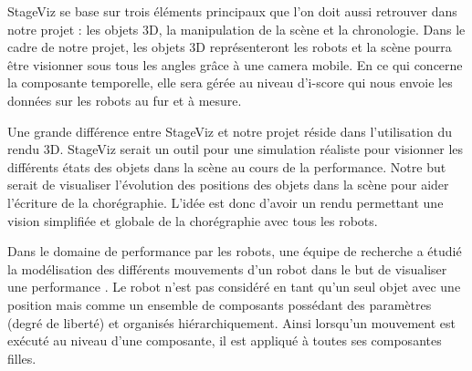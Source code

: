 StageViz se base sur trois éléments principaux que l'on doit aussi retrouver dans notre projet : les objets 3D, la manipulation de la scène et la chronologie. Dans le cadre de notre projet, les objets 3D représenteront les robots et la scène pourra être visionner sous tous les angles grâce à une camera mobile. En ce qui concerne la composante temporelle, elle sera gérée au niveau d'i-score qui nous envoie les données sur les robots au fur et à mesure. 

Une grande différence entre StageViz et notre projet réside dans l'utilisation du rendu 3D. StageViz serait un outil pour une simulation réaliste pour visionner les différents états des objets dans la scène au cours de la performance. Notre but serait de visualiser l'évolution des positions des objets dans la scène pour aider l'écriture de la chorégraphie. L'idée est donc d'avoir un rendu permettant une vision simplifiée et globale de la chorégraphie avec tous les robots.

Dans le domaine de performance par les robots, une équipe de recherche a étudié la modélisation des différents mouvements d'un robot dans le but de visualiser une performance \cite{robotArt}. Le robot n'est pas considéré en tant qu'un seul objet avec une position mais comme un ensemble de composants possédant des paramètres (degré de liberté) et organisés hiérarchiquement. Ainsi lorsqu'un mouvement est exécuté au niveau d'une composante, il est appliqué à toutes ses composantes filles.

